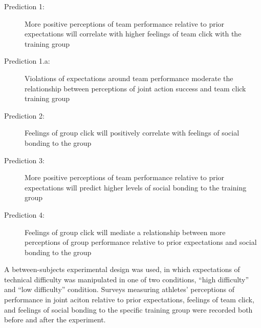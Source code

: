 \begin{description}
\item[Prediction 1:] More positive perceptions of team performance relative to prior expectations will correlate with higher feelings of team click with the training group
\item[Prediction 1.a:] Violations of expectations around team performance moderate the relationship between perceptions of joint action success and team click training group
\item[Prediction 2:] Feelings of group click will positively correlate with feelings of social bonding to the group
\item[Prediction 3:] More positive perceptions of team performance relative to prior expectations will predict higher levels of social bonding to the training group
\item[Prediction 4:] Feelings of group click will mediate a relationship between more perceptions of group performance relative to prior expectations and social bonding to the group
\end{description}

A between-subjects experimental design was used, in which expectations of technical difficulty was manipulated in one of two conditions, ``high difficulty'' and ``low difficulty'' condition.  Surveys measuring athletes' perceptions of performance in joint aciton relative to prior expectations, feelings of team click, and feelings of social bonding to the specific training group were recorded both before and after the experiment.



